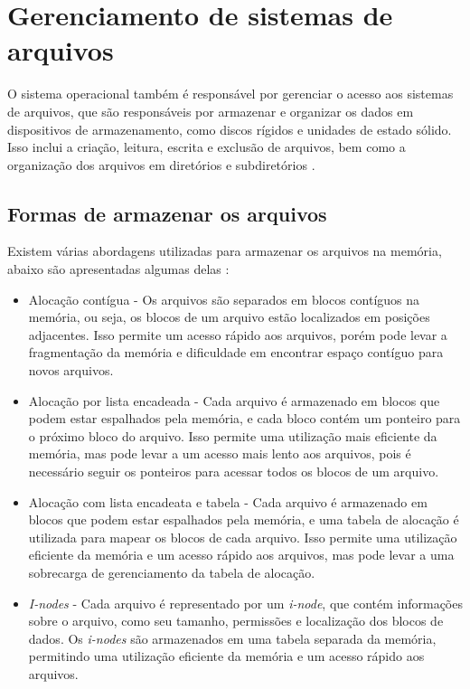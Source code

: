 \documentclass[
	12pt,				%
	oneside,
	a4paper,			%
	english,			%
	french,				%
	spanish,			%
	brazil,				%
	]{abntex2}
\begin{document}
\section{Gerenciamento de sistemas de arquivos}

O sistema operacional também é responsável por gerenciar o acesso aos sistemas de arquivos, que são responsáveis por armazenar e organizar os dados em dispositivos de armazenamento, como discos rígidos e unidades de estado sólido. Isso inclui a criação, leitura, escrita e exclusão de arquivos, bem como a organização dos arquivos em diretórios e subdiretórios \cite{tanenbaum2016sistemas}.	

\subsection{Formas de armazenar os arquivos}

Existem várias abordagens utilizadas para armazenar os arquivos na memória, abaixo são apresentadas algumas delas \cite{tanenbaum2016sistemas}:

\begin{itemize}
    \item Alocação contígua - Os arquivos são separados em blocos contíguos na memória, ou seja, os blocos de um arquivo estão localizados em posições adjacentes. Isso permite um acesso rápido aos arquivos, porém pode levar a fragmentação da memória e dificuldade em encontrar espaço contíguo para novos arquivos.
    \item Alocação por lista encadeada - Cada arquivo é armazenado em blocos que podem estar espalhados pela memória, e cada bloco contém um ponteiro para o próximo bloco do arquivo. Isso permite uma utilização mais eficiente da memória, mas pode levar a um acesso mais lento aos arquivos, pois é necessário seguir os ponteiros para acessar todos os blocos de um arquivo.
    \item Alocação com lista encadeata e tabela - Cada arquivo é armazenado em blocos que podem estar espalhados pela memória, e uma tabela de alocação é utilizada para mapear os blocos de cada arquivo. Isso permite uma utilização eficiente da memória e um acesso rápido aos arquivos, mas pode levar a uma sobrecarga de gerenciamento da tabela de alocação.
    \item \textit{I-nodes} - Cada arquivo é representado por um \textit{i-node}, que contém informações sobre o arquivo, como seu tamanho, permissões e localização dos blocos de dados. Os \textit{i-nodes} são armazenados em uma tabela separada da memória, permitindo uma utilização eficiente da memória e um acesso rápido aos arquivos.
\end{itemize}
\end{document}
